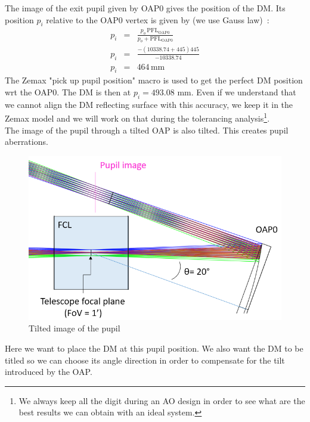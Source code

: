 \documentclass[12pt,a4paper]{article}
\begin{document}
\newpage
The image of the exit pupil given by OAP0 gives the position of the DM. Its position $p_i$ relative to the OAP0 vertex is given by (we use Gauss law)~:
\begin{eqnarray}
	p_i &= &\frac{p_o\,\text{PFL}_{\text{OAP0}}}{p_o+\text{PFL}_{\text{OAP0}}}\\
	p_i &= &\frac{-(10338.74+445)445}{-10338.74}\\
	p_i &= &464\,\text{mm}
\end{eqnarray}
The Zemax "pick up pupil position" macro is used to get the perfect DM position wrt the OAP0. The DM is then at $p_i = 493.08$ mm. Even if we understand that we cannot align the DM reflecting surface with this accuracy, we keep it in the Zemax model  and we will work on that during the tolerancing analysis\footnote{We always keep all the digit during an AO design in order to see what are the best results we can obtain with an ideal system.}. \\
The image of the pupil through a tilted OAP is also tilted. This creates pupil aberrations.
\begin{figure}[H]
	\begin{center}
		\includegraphics[width=.7\linewidth]{images/DM_pupil_tilt.PNG}
		\caption{Tilted image of the pupil}\label{fig:DM_pupil_tilt}
	\end{center}
\end{figure}
Here we want to place the DM at this pupil position. We also want the DM to be titled so we can choose its angle direction in order to compensate for the tilt introduced by the OAP.
\end{document}
